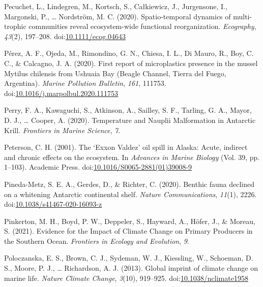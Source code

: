 \documentclass[
]{article}
\newlength{\cslhangindent}
\newlength{\cslentryspacingunit} %
\newenvironment{CSLReferences}[2] %
 {%
  \setlength{\parindent}{0pt}
  \ifodd #1
  \let\oldpar\par
  \def\par{\hangindent=\cslhangindent\oldpar}
  \fi
  \setlength{\parskip}{#2\cslentryspacingunit}
 }%
 {}
\begin{document}
\begin{CSLReferences}{1}{0}
\leavevmode{}%
Pecuchet, L., Lindegren, M., Kortsch, S., Całkiewicz, J., Jurgensone,
I., Margonski, P., \ldots{} Nordström, M. C. (2020). Spatio-temporal
dynamics of multi-trophic communities reveal ecosystem-wide functional
reorganization. \emph{Ecography}, \emph{43}(2), 197--208.
doi:\href{https://doi.org/10.1111/ecog.04643}{10.1111/ecog.04643}

\leavevmode{}%
Pérez, A. F., Ojeda, M., Rimondino, G. N., Chiesa, I. L., Di Mauro, R.,
Boy, C. C., \& Calcagno, J. A. (2020). First report of microplastics
presence in the mussel {Mytilus} chilensis from {Ushuaia Bay} ({Beagle
Channel}, {Tierra} del {Fuego}, {Argentina}). \emph{Marine Pollution
Bulletin}, \emph{161}, 111753.
doi:\href{https://doi.org/10.1016/j.marpolbul.2020.111753}{10.1016/j.marpolbul.2020.111753}

\leavevmode{}%
Perry, F. A., Kawaguchi, S., Atkinson, A., Sailley, S. F., Tarling, G.
A., Mayor, D. J., \ldots{} Cooper, A. (2020).
Temperature and {Nauplii
Malformation} in {Antarctic Krill}. \emph{Frontiers in Marine Science},
\emph{7}.

\leavevmode{}%
Peterson, C. H. (2001). The {`{Exxon Valdez}'} oil spill in {Alaska}:
{Acute}, indirect and chronic effects on the ecosystem. In
\emph{Advances in {Marine Biology}} (Vol. 39, pp. 1--103). {Academic
Press}.
doi:\href{https://doi.org/10.1016/S0065-2881(01)39008-9}{10.1016/S0065-2881(01)39008-9}

\leavevmode{}%
Pineda-Metz, S. E. A., Gerdes, D., \& Richter, C. (2020). Benthic fauna
declined on a whitening {Antarctic} continental shelf. \emph{Nature
Communications}, \emph{11}(1), 2226.
doi:\href{https://doi.org/10.1038/s41467-020-16093-z}{10.1038/s41467-020-16093-z}

\leavevmode{}%
Pinkerton, M. H., Boyd, P. W., Deppeler, S., Hayward, A., Höfer, J., \&
Moreau, S. (2021). Evidence for the {Impact} of {Climate Change} on
{Primary Producers} in the {Southern Ocean}. \emph{Frontiers in Ecology
and Evolution}, \emph{9}.

\leavevmode{}%
Poloczanska, E. S., Brown, C. J., Sydeman, W. J., Kiessling, W.,
Schoeman, D. S., Moore, P. J., \ldots{} Richardson, A. J. (2013). Global
imprint of climate change on marine life. \emph{Nature Climate Change},
\emph{3}(10), 919--925.
doi:\href{https://doi.org/10.1038/nclimate1958}{10.1038/nclimate1958}


\end{CSLReferences}
\end{document}
